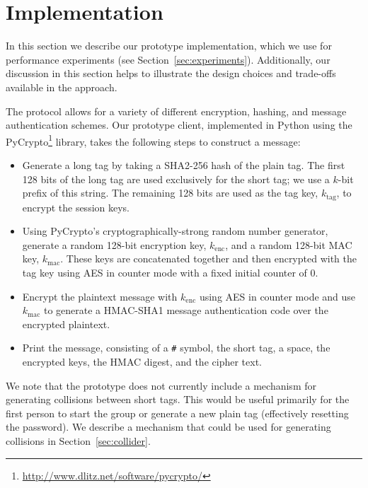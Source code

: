 \section{Implementation}
\label{sec:implementation}

In this section we describe our prototype \hoot implementation, which we
use for performance experiments (see
Section~\ref{sec:experiments}). Additionally, our discussion in this
section helps to illustrate the design choices and trade-offs available
in the \hoot approach.

The \hoot protocol allows for a variety of different encryption,
hashing, and message authentication schemes. Our prototype client,
implemented in Python using the PyCrypto\footnote{\url{http://www.dlitz.net/software/pycrypto/}} library, takes the following steps to construct a message:
\begin{itemize}
\item Generate a long tag by taking a SHA2-256 hash of the plain
  tag. The first 128 bits of the long tag are used exclusively for the
  short tag; we use a $k$-bit prefix of this string. The remaining 128
  bits are used as the tag key, $k_{\mathrm{tag}}$, to encrypt the
  session keys.
\item Using PyCrypto's cryptographically-strong random number generator, generate 
  a random 128-bit encryption key, $k_{\mathrm{enc}}$, and a random 128-bit MAC key,
  $k_{\mathrm{mac}}$. These keys are
  concatenated together and then encrypted with the tag key using AES in
  counter mode with a fixed initial counter of $0$.
\item Encrypt the plaintext message with $k_{\mathrm{enc}}$ using AES in
  counter mode and use $k_{\mathrm{mac}}$ to generate a HMAC-SHA1
  message authentication code over the encrypted plaintext.
\item Print the message, consisting of a {\tt \#} symbol, the short tag,
  a space, the encrypted keys, the HMAC digest, and the cipher text.
\end{itemize}

We note that the prototype does not currently include a mechanism for
generating collisions between short tags. This would be useful primarily
for the first person to start the group or generate a new plain tag
(effectively resetting the password). We describe a mechanism that
could be used for generating collisions in Section~\ref{sec:collider}.

